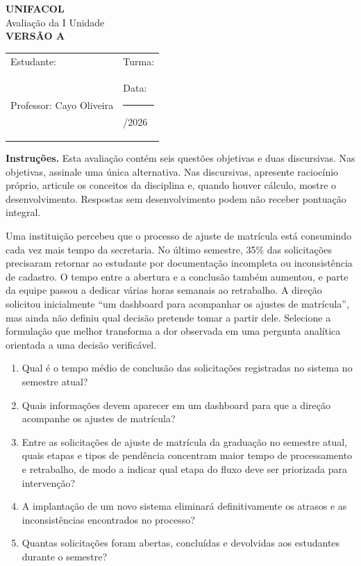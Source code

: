 \documentclass[12pt,a4paper]{article}
\begin{document}
\begin{center}
{\Large\bfseries UNIFACOL}\\[2mm]
{\large Avaliação da I Unidade}\\[1mm]
{\Large\bfseries VERSÃO A}
\end{center}

\begin{DocumentBox}[Identificação]
\begin{tabularx}{\textwidth}{@{}p{}p{}@{}}
Estudante: \hrulefill & Turma: \hrulefill\\[3mm]
Professor: Cayo Oliveira & Data: \rule{2.7cm}{.2pt}/2026
\end{tabularx}
\end{DocumentBox}

\textbf{Instruções.} Esta avaliação contém seis questões objetivas e duas discursivas. Nas objetivas, assinale uma única alternativa. Nas discursivas, apresente raciocínio próprio, articule os conceitos da disciplina e, quando houver cálculo, mostre o desenvolvimento. Respostas sem desenvolvimento podem não receber pontuação integral.

\TextoBase
Uma instituição percebeu que o processo de ajuste de matrícula está consumindo cada vez mais tempo da secretaria. No último semestre, 35\% das solicitações precisaram retornar ao estudante por documentação incompleta ou inconsistência de cadastro. O tempo entre a abertura e a conclusão também aumentou, e parte da equipe passou a dedicar várias horas semanais ao retrabalho. A direção solicitou inicialmente ``um dashboard para acompanhar os ajustes de matrícula'', mas ainda não definiu qual decisão pretende tomar a partir dele.
\FonteDidatica
\Comando Selecione a formulação que melhor transforma a dor observada em uma pergunta analítica orientada a uma decisão verificável.
\begin{enumerate}[label=\Alph*)]
\item Qual é o tempo médio de conclusão das solicitações registradas no sistema no semestre atual?
\item Quais informações devem aparecer em um dashboard para que a direção acompanhe os ajustes de matrícula?
\item Entre as solicitações de ajuste de matrícula da graduação no semestre atual, quais etapas e tipos de pendência concentram maior tempo de processamento e retrabalho, de modo a indicar qual etapa do fluxo deve ser priorizada para intervenção?
\item A implantação de um novo sistema eliminará definitivamente os atrasos e as inconsistências encontrados no processo?
\item Quantas solicitações foram abertas, concluídas e devolvidas aos estudantes durante o semestre?
\end{enumerate}
\end{document}
